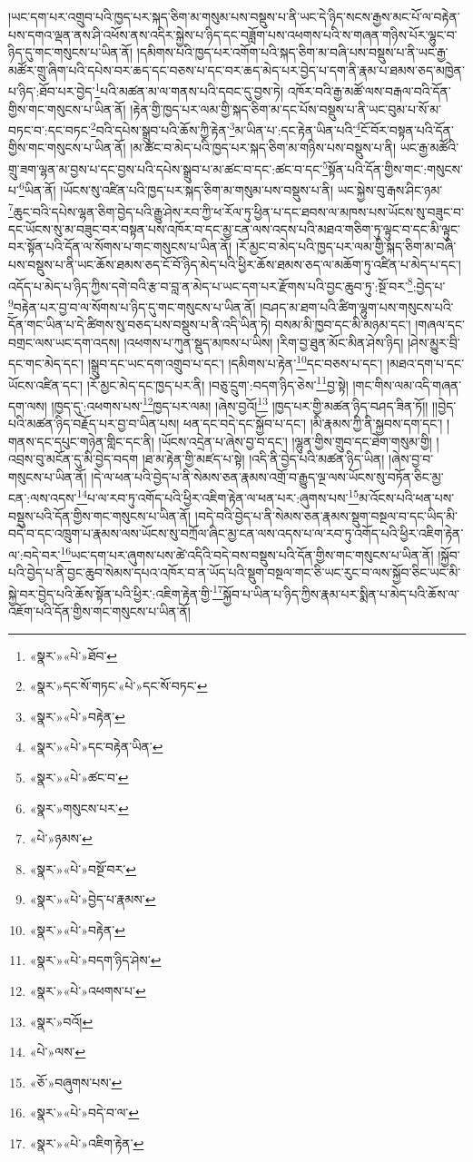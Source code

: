 །ཡང་དག་པར་འགྲུབ་པའི་ཁྱད་པར་སྐད་ཅིག་མ་གསུམ་པས་བསྡུས་པ་ནི་ཡང་དེ་ཉིད་སངས་རྒྱས་མང་པོ་ལ་བརྟེན་པས་དགའ་ལྡན་ནས་ཤི་འཕོས་ནས་འདིར་སྐྱེས་པ་ཉིད་དང་བཟློག་པས་འཕགས་པའི་ས་གཞན་གཉིས་པོར་ལྷུང་བ་ཉིད་དུ་གང་གསུངས་པ་ཡིན་ནོ། །དམིགས་པའི་ཁྱད་པར་འགོག་པའི་སྐད་ཅིག་མ་བཞི་པས་བསྡུས་པ་ནི་ཡང་རྒྱ་མཚོར་གྲུ་ཞིག་པའི་དཔེས་བར་ཆད་དང་བཅས་པ་དང་བར་ཆད་མེད་པར་བྱེད་པ་དག་ནི་རྣམ་པ་ཐམས་ཅད་མཁྱེན་པ་ཉིད་:ཐོབ་པར་བྱེད་\footnote{«སྣར་»«པེ་»ཐོབ་}པའི་མཚན་མ་ལ་གནས་པའི་དབང་དུ་བྱས་ཏེ། འཁོར་བའི་རྒྱ་མཚོ་ལས་བརྒལ་བའི་དོན་གྱིས་གང་གསུངས་པ་ཡིན་ནོ། །རྟེན་གྱི་ཁྱད་པར་ལམ་གྱི་སྐད་ཅིག་མ་དང་པོས་བསྡུས་པ་ནི་ཡང་བུམ་པ་སོ་མ་བཏང་བ་:དང་བཏང་\footnote{«སྣར་»དང་སོ་གཏང་«པེ་»དང་སོ་བཏང་}བའི་དཔེས་སྒྲུབ་པའི་ཆོས་ཀྱི་རྟེན་\footnote{«སྣར་»«པེ་»བརྟེན་}མ་ཡིན་པ་:དང་རྟེན་ཡིན་པའི་\footnote{«སྣར་»«པེ་»དང་བརྟེན་ཡིན་}ངོ་བོར་བསྟན་པའི་དོན་གྱིས་གང་གསུངས་པ་ཡིན་ནོ། །མ་ཚང་བ་མེད་པའི་ཁྱད་པར་སྐད་ཅིག་མ་གཉིས་པས་བསྡུས་པ་ནི། ཡང་རྒྱ་མཚོའི་གྲུ་ཟག་ལྷན་མ་བྱས་པ་དང་བྱས་པའི་དཔེས་སྒྲུབ་པ་མ་ཚང་བ་དང་:ཚང་བ་དང་\footnote{«སྣར་»«པེ་»ཚང་བ་}སྟོན་པའི་དོན་གྱིས་གང་:གསུངས་པ་\footnote{«སྣར་»གསུངས་པར་}ཡིན་ནོ། །ཡོངས་སུ་འཛིན་པའི་ཁྱད་པར་སྐད་ཅིག་མ་གསུམ་པས་བསྡུས་པ་ནི། ཡང་སྐྱེས་བུ་རྒས་ཤིང་ཉམ་\footnote{«པེ་»ཉམས་}ཆུང་བའི་དཔེས་ལྷན་ཅིག་བྱེད་པའི་རྒྱུ་ཤེས་རབ་ཀྱི་ཕ་རོལ་ཏུ་ཕྱིན་པ་དང་ཐབས་ལ་མཁས་པས་ཡོངས་སུ་བཟུང་བ་དང་ཡོངས་སུ་མ་བཟུང་བར་བསྟན་པས་འཁོར་བ་དང་མྱ་ངན་ལས་འདས་པའི་མཐའ་གཅིག་ཏུ་ལྟུང་བ་དང་མི་ལྟུང་བར་སྟོན་པའི་དོན་ལ་སོགས་པ་གང་གསུངས་པ་ཡིན་ནོ། །རོ་མྱང་བ་མེད་པའི་ཁྱད་པར་ལམ་གྱི་སྐད་ཅིག་མ་བཞི་པས་བསྡུས་པ་ནི་ཡང་ཆོས་ཐམས་ཅད་ངོ་བོ་ཉིད་མེད་པའི་ཕྱིར་ཆོས་ཐམས་ཅད་ལ་མཆོག་ཏུ་འཛིན་པ་མེད་པ་དང་། འདོད་པ་མེད་པ་ཉིད་ཀྱིས་དགེ་བའི་རྩ་བ་བླ་ན་མེད་པ་ཡང་དག་པར་རྫོགས་པའི་བྱང་ཆུབ་ཏུ་:སྔོ་བར་\footnote{«སྣར་»«པེ་»བསྔོ་བར་}:བྱེད་པ་\footnote{«སྣར་»«པེ་»བྱེད་པ་རྣམས་}བརྟེན་པར་བྱ་བ་ལ་སོགས་པ་ཉིད་དུ་གང་གསུངས་པ་ཡིན་ནོ། །བཤད་མ་ཐག་པའི་ཚིག་ལྷུག་པས་གསུངས་པའི་དོན་གང་ཡིན་པ་དེ་ཚིགས་སུ་བཅད་པས་བསྡུས་པ་ནི་འདི་ཡིན་ཏེ། བསམ་མི་ཁྱབ་དང་མི་མཉམ་དང་། །གཞལ་དང་བགྲང་ལས་ཡང་དག་འདས། །འཕགས་པ་ཀུན་སྡུད་མཁས་པ་ཡིས། །རིག་བྱ་ཐུན་མོང་མིན་ཤེས་ཉིད། །ཤེས་མྱུར་བྲི་དང་གང་མེད་དང་། །སྒྲུབ་དང་ཡང་དག་འགྲུབ་པ་དང་། །དམིགས་པ་རྟེན་\footnote{«སྣར་»«པེ་»བརྟེན་}དང་བཅས་པ་དང་། །མཐའ་དག་པ་དང་ཡོངས་འཛིན་དང་། །རོ་མྱང་མེད་དང་ཁྱད་པར་ནི། །བཅུ་དྲུག་:བདག་ཉིད་ཅེས་\footnote{«སྣར་»«པེ་»བདག་ཉིད་ཤེས་}བྱ་སྟེ། །གང་གིས་ལམ་འདི་གཞན་དག་ལས། །ཁྱད་དུ་:འཕགས་པས་\footnote{«སྣར་»«པེ་»འཕགས་པ་}ཁྱད་པར་ལམ། །ཞེས་བྱའོ།\footnote{«སྣར་»བའོ།} །ཁྱད་པར་གྱི་མཚན་ཉིད་བཤད་ཟིན་ཏོ།། །།བྱེད་པའི་མཚན་ཉིད་བརྗོད་པར་བྱ་བ་ཡིན་པས། ཕན་དང་བདེ་དང་སྐྱོབ་པ་དང་། །མི་རྣམས་ཀྱི་ནི་སྐྱབས་དག་དང་། །གནས་དང་དཔུང་གཉེན་གླིང་དང་ནི། །ཡོངས་འདྲེན་པ་ཞེས་བྱ་བ་དང་། །ལྷུན་གྱིས་གྲུབ་དང་ཐེག་གསུམ་གྱི། །འབྲས་བུ་མངོན་དུ་མི་བྱེད་བདག །ཐ་མ་རྟེན་གྱི་མཛད་པ་སྟེ། །འདི་ནི་བྱེད་པའི་མཚན་ཉིད་ཡིན། །ཞེས་བྱ་བ་གསུངས་པ་ཡིན་ནོ། །དེ་ལ་ཕན་པའི་བྱེད་པ་ནི་སེམས་ཅན་རྣམས་འགྲོ་བ་རྒྱུད་ལྔ་ལས་ཡོངས་སུ་བཏོན་ཅིང་མྱ་ངན་:ལས་འདས་\footnote{«པེ་»ལས་}པ་ལ་རབ་ཏུ་འགོད་པའི་ཕྱིར་འཇིག་རྟེན་ལ་ཕན་པར་:ཞུགས་པས་\footnote{«ཅོ་»བཞུགས་པས་}མ་འོངས་པའི་ཕན་པས་བསྡུས་པའི་དོན་གྱིས་གང་གསུངས་པ་ཡིན་ནོ། །བདེ་བའི་བྱེད་པ་ནི་སེམས་ཅན་རྣམས་སྡུག་བསྔལ་བ་དང་ཡིད་མི་བདེ་བ་དང་འཁྲུག་པ་རྣམས་ལས་ཡོངས་སུ་བཀྲོལ་ཞིང་མྱ་ངན་ལས་འདས་པ་ལ་རབ་ཏུ་འགོད་པའི་ཕྱིར་འཇིག་རྟེན་ལ་:བདེ་བར་\footnote{«སྣར་»«པེ་»བདེ་བ་ལ་}ཡང་དག་པར་ཞུགས་པས་ཚེ་འདིའི་བདེ་བས་བསྡུས་པའི་དོན་གྱིས་གང་གསུངས་པ་ཡིན་ནོ། །སྐྱོབ་པའི་བྱེད་པ་ནི་བྱང་ཆུབ་སེམས་དཔའ་འཁོར་བ་ན་ཡོད་པའི་སྡུག་བསྔལ་གང་ཅི་ཡང་རུང་བ་ལས་སྐྱོབ་ཅིང་ཡང་མི་སྐྱེ་བར་བྱེད་པའི་ཆོས་སྟོན་པའི་ཕྱིར་:འཇིག་རྟེན་གྱི་\footnote{«སྣར་»«པེ་»འཇིག་རྟེན་}སྐྱོབ་པ་ཡིན་པ་ཉིད་ཀྱིས་རྣམ་པར་སྨིན་པ་མེད་པའི་ཆོས་ལ་འཇོག་པའི་དོན་གྱིས་གང་གསུངས་པ་ཡིན་ནོ། 